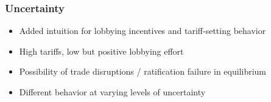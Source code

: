 \documentclass[handout]{beamer}
\newcommand{\expect}{\mathbb{E}}
\newcommand{\bta}{\bm{\tau^a}}
\newenvironment{changemargin}[2]{%
  \begin{list}{}{%
    \setlength{\topsep}{0pt}%
    \setlength{\leftmargin}{#1}%
    \setlength{\rightmargin}{#2}%
    \setlength{\listparindent}{\parindent}%
    \setlength{\itemindent}{\parindent}%
    \setlength{\parsep}{\parskip}%
  }%
  \item[]}{\end{list}}
\begin{document}
\begin{comment}
\begin{frame}{Comparing Government Structures}
\begin{changemargin}{-1cm}{-1cm}
\begin{table}
\centering
  \begin{tabular}{lrrrr}
		\toprule
			Structure & $\bta$ & Lobbying & $B(\bta)$ & $\expect[\bta]$ \\
			\midrule
			Unitary, No Agreement & ---- & 0.0017 & 0 & 0.129 \\
			Unitary, Agreement & 0.118 & 0.0027 & 0 & 0.118 \\
			\\
			Exec-led Agreement (.25) & 0.078 & 0.0007 & 0.48 & 0.102 \\
			Exec-led Agreement (.00) & 0.106 & 0.0000 & 0 & 0.106 \\
			& {\color{gray}(.105)} & {\color{gray}(.0025)} & {\color{gray}(1)} & {\color{gray}(.129)} \\
		\bottomrule
	\end{tabular}
	\end{table}
\end{changemargin}
\end{frame}



\begin{frame}{Comparative Systems}
\begin{beamerboxesrounded}[upper=palette tertiary, shadow=true]{Conjecture}
    Lobbying effort and tariffs are reduced by the presence of executive branches who form a trade agreement.
\end{beamerboxesrounded}

\pause
\vskip.2in
\begin{beamerboxesrounded}[upper=palette tertiary, shadow=true]{Corollary}
    Tariffs are lower in countries with separated powers than in those with unitary governments.
\end{beamerboxesrounded}
\end{frame}
\end{comment}



\begin{frame}[label=Uncertainty]
\frametitle{Uncertainty}
\begin{itemize}[<+->]
	\item Added intuition for lobbying incentives and tariff-setting behavior
  \item High tariffs, low but positive lobbying effort
  \item Possibility of trade disruptions / ratification failure in equilibrium
  \item Different behavior at varying levels of uncertainty
\end{itemize}
\end{frame}
\end{document}

